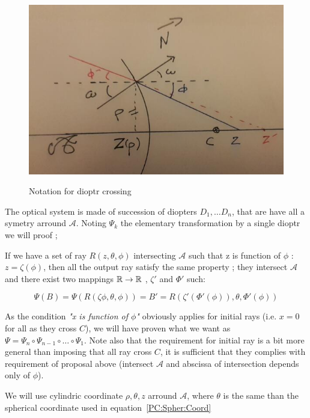 \begin{figure}
\centering
	\includegraphics[width=12cm]{Methods/Images/Radial-PhiOmegaZ.jpg} \\
	\caption{Notation for dioptr crossing}
	\label{fig:RadPhiOmegZ}
\end{figure}

The optical system is made of succession of diopters $D_1,\dots D_n$,
that are have all a symetry arround $\mathcal{A}$.  Noting $\Psi_k$
the elementary transformation by a single dioptr  we will  proof ;

\begin{proposal}  \;
If  we have a set of ray $R(z,\theta,\phi)$ intersecting  $\mathcal{A}$ such that  z is function of $\phi$ :
$z=\zeta(\phi)$, then  all the output ray satisfy the same property ; they intersect $\mathcal{A}$ and there exist 
two mappings  $\mathbb{R} \rightarrow \mathbb{R}$ , $\zeta'$ and $\Phi'$  such:

\begin{equation}
	\Psi(B) = \Psi(R(\zeta{\phi},\theta,\phi)) =  B' = R(\zeta'(\Phi'(\phi)),\theta,\Phi'(\phi))
\end{equation}
\end{proposal}

As the condition \emph{"x is function of $\phi$"} obviously applies for initial rays (i.e. $x=0$ for all as they cross $C$),
we will have proven what we want as $\Psi = \Psi_n \circ  \Psi_{n-1} \circ \dots \circ \Psi_1$. Note also that the requirement
for initial ray is a bit more general than imposing that all ray cross $C$, it is sufficient that they complies with requirement
of proposal above (intersect $\mathcal{A}$ and abscissa of intersection depends only of $\phi$).


We will use cylindric coordinate $\rho,\theta,z$ arround $\mathcal{A}$, where $\theta$ is the same than the spherical
coordinate used in equation~\ref{PC:Spher:Coord}

